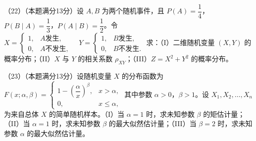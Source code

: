 \documentclass[UTF8,12pt]{ctexart}
\begin{document}
（22）（本题满分13分）设 \(\displaystyle A,\allowbreak B\) 为两个随机事件，且 \(\displaystyle P(A)=\dfrac{\displaystyle 1}{\displaystyle 4}\)，\(\displaystyle P(B\mid A)=\dfrac{\displaystyle 1}{\displaystyle 3}\)，\(\displaystyle P(A\mid B)=\dfrac{\displaystyle 1}{\displaystyle 2}\)。令 \(\displaystyle X=\begin{cases}1,\allowbreak &A\text{发生},\allowbreak \\0,\allowbreak &A\text{不发生},\allowbreak \end{cases}\quad Y=\begin{cases}1,\allowbreak &B\text{发生},\allowbreak \\0,\allowbreak &B\text{不发生}.\end{cases}\) 求：（I）二维随机变量 \(\displaystyle (X,\allowbreak Y)\) 的概率分布；（II）\(\displaystyle X\) 与 \(\displaystyle Y\) 的相关系数 \(\displaystyle \rho_{XY}\)；（III）\(\displaystyle Z=X^2+Y^2\) 的概率分布。


（23）（本题满分13分）设随机变量 \(\displaystyle X\) 的分布函数为 \(\displaystyle F(x;\alpha,\allowbreak \beta)=\begin{cases}1-(\dfrac{\displaystyle \alpha}{\displaystyle x})^\beta,\allowbreak &x>\alpha,\allowbreak \\0,\allowbreak &x\le\alpha,\allowbreak \end{cases}\) 其中参数 \(\displaystyle \alpha>0\)，\(\displaystyle \beta>1\)。设 \(\displaystyle X_1,\allowbreak X_2,\allowbreak \ldots,\allowbreak X_n\) 为来自总体 \(\displaystyle X\) 的简单随机样本。（I）当 \(\displaystyle \alpha=1\) 时，求未知参数 \(\displaystyle \beta\) 的矩估计量；（II）当 \(\displaystyle \alpha=1\) 时，求未知参数 \(\displaystyle \beta\) 的最大似然估计量；（III）当 \(\displaystyle \beta=2\) 时，求未知参数 \(\displaystyle \alpha\) 的最大似然估计量。
\end{document}

